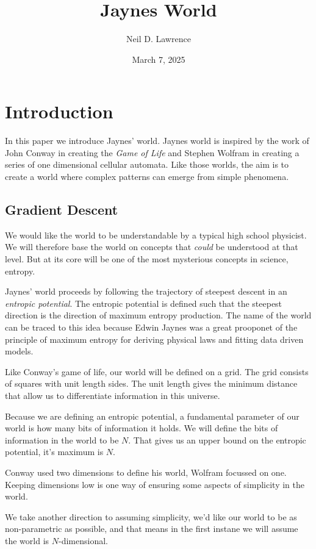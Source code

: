 \documentclass[11pt,a4paper]{article}
\title{\LARGE \textbf{Jaynes World}}
\author{Neil D. Lawrence}
\date{March 7, 2025}
\begin{document}
\maketitle

\begin{abstract}
\end{abstract}

\section{Introduction}

In this paper we introduce Jaynes' world. Jaynes world is inspired by the work of John Conway in creating the \emph{Game of Life} and Stephen Wolfram in creating a series of one dimensional cellular automata. Like those worlds, the aim is to create a world where complex patterns can emerge from simple phenomena. 

\subsection{Gradient Descent}

We would like the world to be understandable by a typical high school physicist. We will therefore base the world on concepts that \emph{could} be understood at that level. But at its core will be one of the most mysterious concepts in science, entropy. 

Jaynes' world proceeds by following the trajectory of steepest descent in an \emph{entropic potential}. The entropic potential is defined such that the steepest direction is the direction of maximum entropy production. The name of the world can be traced to this idea because Edwin Jaynes was a great prooponet of the principle of maximum entropy for deriving physical laws and fitting data driven models. 

Like Conway's game of life, our world will be defined on a grid. The grid consists of squares with unit length sides. The unit length gives the minimum distance that allow us to differentiate information in this universe. 

Because we are defining an entropic potential, a fundamental parameter of our world is how many bits of information it holds. We will define the bits of information in the world to be $N$. That gives us an upper bound on the entropic potential, it's maximum is $N$.

Conway used two dimensions to define his world, Wolfram focussed on one. Keeping dimensions low is one way of ensuring some aspects of simplicity in the world.

We take another direction to assuming simplicity, we'd like our world to be as non-parametric as possible, and that means in the first instane we will assume the world is $N$-dimensional.  

\printbibliography
\end{document}
